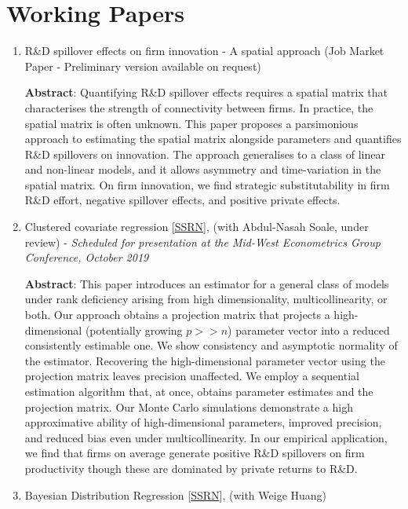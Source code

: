 \documentclass[12pt,letterpaper]{article}
\begin{document}
\section*{Working Papers} %
\begin{enumerate}
	\item R\&D spillover effects on firm innovation - A spatial approach (Job Market Paper - Preliminary version available on request)
	
	\textbf{Abstract}: Quantifying R\&D spillover effects requires a spatial matrix that characterises the strength
of connectivity between firms. In practice, the spatial matrix is often unknown. This paper
proposes a parsimonious approach to estimating the spatial matrix alongside parameters and
quantifies R\&D spillovers on innovation. The approach generalises to a class of linear and
non-linear models, and it allows asymmetry and time-variation in the spatial matrix. On firm
innovation, we find strategic substitutability in firm R\&D effort, negative spillover effects, and
positive private effects.
	
	\item Clustered covariate regression [\href{https://papers.ssrn.com/sol3/papers.cfm?abstract_id=3394012}{SSRN}], (with Abdul-Nasah Soale, under review) - \textit{Scheduled for presentation at the Mid-West Econometrics Group Conference, October 2019}
	
	\textbf{Abstract}: This paper introduces an estimator for a general class of models under rank deficiency arising from high dimensionality, multicollinearity, or both. Our approach obtains a projection matrix that projects a high-dimensional (potentially growing $ p >> n $) parameter vector into a reduced consistently estimable one. We show consistency and asymptotic normality of the estimator. Recovering the high-dimensional parameter vector using the projection matrix leaves precision unaffected. We employ a sequential estimation algorithm that, at once, obtains parameter estimates and the projection matrix. Our Monte Carlo simulations demonstrate a high approximative ability of high-dimensional parameters, improved precision, and reduced bias even under multicollinearity. In our empirical application, we find that firms on average generate positive R\&D spillovers on firm productivity though these are dominated by private returns to R\&D.
	
	
	\item Bayesian Distribution Regression [\href{https://papers.ssrn.com/sol3/papers.cfm?abstract_id=3048658}{SSRN}], (with Weige Huang)
	

\end{enumerate}
\end{document}
